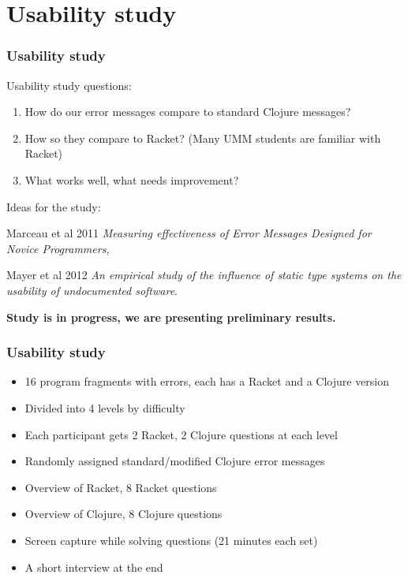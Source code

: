 \documentclass{beamer}
\newcommand{\comment}[1]{{\bf \tt  {#1}}}
\newcommand{\emcomment}[1]{\textcolor{ForestGreen}{\comment{Elena: {#1}}}}
\begin{document}
\section{Usability study}

\begin{frame}
\frametitle{Usability study}
Usability study questions:
\begin{enumerate}
\item How do our error messages compare to standard Clojure messages?
\item How so they compare to Racket? (Many UMM students are familiar with Racket)
\item What works well, what needs improvement? 
\end{enumerate}
Ideas for the study:

Marceau et al 2011 {\it Measuring effectiveness  of Error Messages Designed for Novice Programmers}, 

Mayer et al 2012 {\it  An empirical study of the influence of static
type systems on the usability of undocumented software}. 


{\bf Study is in progress, we are presenting preliminary results.}
\end{frame}

\begin{frame}
\frametitle{Usability study}
\begin{itemize}
\item 16 program fragments with errors, each has a Racket and a Clojure version 
\item Divided into 4 levels by difficulty
\item Each participant gets 2 Racket, 2 Clojure questions at each level
\item Randomly assigned standard/modified Clojure error messages
\item Overview of Racket, 8 Racket questions 
\item Overview of Clojure, 8 Clojure questions
\item Screen capture while solving questions (21 minutes each set)
\item A short interview at the end
\end{itemize}
\end{frame}
\end{document}

